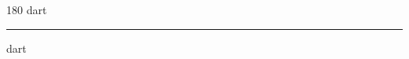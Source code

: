 
\begin{frame}
\begin{center}
\begin{turn}{180}
{\fontsize{2.5cm}{1em}\selectfont dart}
\end{turn}
\vspace{1em}\par  
\hrule
\vspace{1em}\par  
{\fontsize{2.5cm}{1em}\selectfont dart}
\end{center}
\end{frame}
